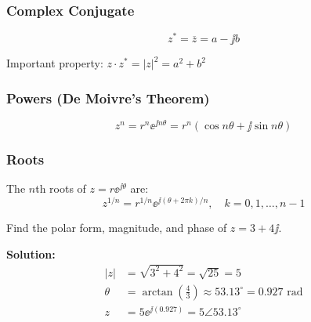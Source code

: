 \subsubsection{Complex Conjugate}
\begin{equation}
z^* = \overline{z} = a - \jj b
\end{equation}

Important property: $z \cdot z^* = |z|^2 = a^2 + b^2$

\subsubsection{Powers (De Moivre's Theorem)}
\begin{equation}
z^n = r^n \ee^{\jj n\theta} = r^n(\cos n\theta + \jj\sin n\theta)
\end{equation}

\subsubsection{Roots}
The $n$th roots of $z = r\ee^{\jj\theta}$ are:
\begin{equation}
z^{1/n} = r^{1/n} \ee^{\jj(\theta + 2\pi k)/n}, \quad k = 0, 1, \ldots, n-1
\end{equation}

\begin{examplebox}[title=Example 0.1: Complex Number Operations]
Find the polar form, magnitude, and phase of $z = 3 + 4\jj$.

\textbf{Solution:}
\begin{align}
|z| &= \sqrt{3^2 + 4^2} = \sqrt{25} = 5 \\
\theta &= \arctan\left(\frac{4}{3}\right) \approx 53.13^{\circ} = 0.927 \text{ rad} \\
z &= 5\ee^{\jj(0.927)} = 5\angle 53.13^{\circ}
\end{align}
\end{examplebox}

